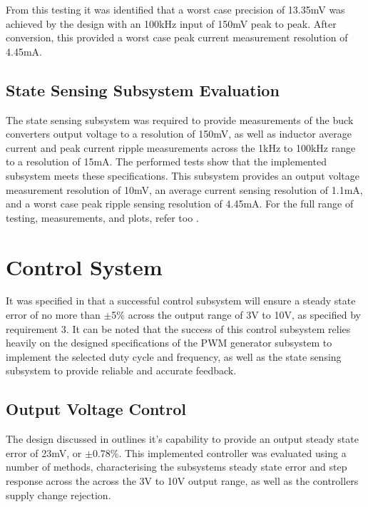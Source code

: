 From this testing it was identified that a worst case precision of 13.35mV was achieved by the design with an 100kHz input of 150mV peak to peak. After conversion, this provided a worst case peak current measurement resolution of 4.45mA. 

\subsection{State Sensing Subsystem Evaluation}

The state sensing subsystem was required to provide measurements of the buck converters output voltage to a resolution of 150mV, as well as inductor average current and peak current ripple measurements across the 1kHz to 100kHz range to a resolution of 15mA. The performed tests show that the implemented subsystem meets these specifications. This subsystem provides an output voltage measurement resolution of 10mV, an average current sensing resolution of 1.1mA, and a worst case peak ripple sensing resolution of 4.45mA. For the full range of testing, measurements, and plots, refer too .


\section{Control System}\label{S:control_eval}

It was specified in  that a successful control subsystem will ensure a steady state error of no more than $\pm$5\% across the output range of 3V to 10V, as specified by requirement 3. It can be noted that the success of this control subsystem relies heavily on the designed specifications of the PWM generator subsystem to implement the selected duty cycle and frequency, as well as the state sensing subsystem to provide reliable and accurate feedback. 

\subsection*{Output Voltage Control}

The design discussed in  outlines it's capability to provide an output steady state error of 23mV, or $\pm$0.78\%. This implemented controller was evaluated using a number of methods, characterising the subsystems steady state error and step response across the across the 3V to 10V output range, as well as the controllers supply change rejection.\\

